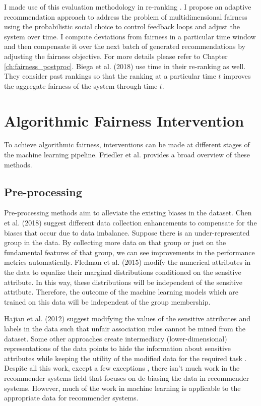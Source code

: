         I made use of this evaluation methodology in re-ranking \cite{sonboli2020dynm}. I propose an adaptive recommendation approach to address the problem of multidimensional fairness using the probabilistic social choice to control feedback loops and adjust the system over time. I compute deviations from fairness in a particular time window and then compensate it over the next batch of generated recommendations by adjusting the fairness objective. For more details please refer to Chapter \ref{ch:fairness_postproc}. Biega et al. (2018) \cite{biega2018equity} use time in their re-ranking as well. They consider past rankings so that the ranking at a particular time $t$ improves the aggregate fairness of the system through time $t$.
        

\section{Algorithmic Fairness Intervention}
    To achieve algorithmic fairness, interventions can be made at different stages of the machine learning pipeline. Friedler et al. \cite{Friedler2019} provides a broad overview of these methods.

    \subsection{Pre-processing}
        Pre-processing methods aim to alleviate the existing biases in the dataset. Chen et al. (2018) \cite{chen2018why} suggest different data collection enhancements to compensate for the biases that occur due to data imbalance. Suppose there is an under-represented group in the data. By collecting more data on that group or just on the fundamental features of that group, we can see improvements in the performance metrics automatically. Fledman et al. (2015) \cite{Feldman2015} modify the numerical attributes in the data to equalize their marginal distributions conditioned on the sensitive attribute. In this way, these distributions will be independent of the sensitive attribute. Therefore, the outcome of the machine learning models which are trained on this data will be independent of the group membership. 
        
        Hajian et al. (2012) \cite{hajian2012methodology} suggest modifying the values of the sensitive attributes and labels in the data such that unfair association rules cannot be mined from the dataset. Some other approaches create intermediary (lower-dimensional) representations of the data points to hide the information about sensitive attributes while keeping the utility of the modified data for the required task \cite{zemel2013learning,lahoti2019ifair}. Despite all this work, except a few exceptions \cite{ekstrand2018all}, there isn't much work in the recommender systems field that focuses on de-biasing the data in recommender systems. However, much of the work in machine learning is applicable to the appropriate data for recommender systems. 

